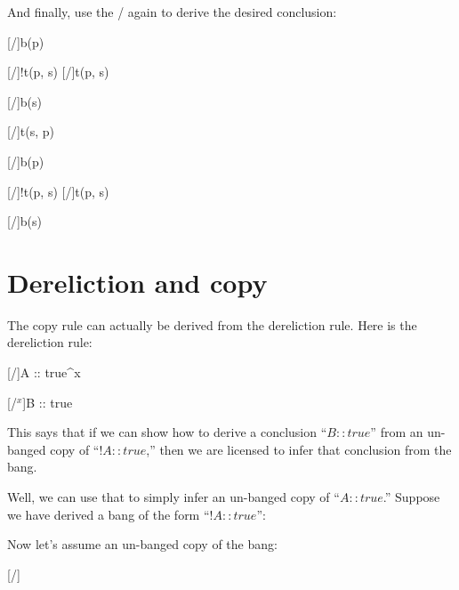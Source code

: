 \documentclass[../../../main.tex]{subfiles}
\begin{document}
\noindent
And finally, use the \traderule/ again to derive the desired conclusion:

\begin{prooftree*}
  \hypo{}
  [\startrule/]{b(p)}
  
  \hypo{}
  [\startrule/]{!t(p, s)}
  [\bangCopy/]{t(p, s)}
  
  [\traderule/]{b(s)}
  
  \hypo{}
  [\startrule/]{t(s, p)}
  
  [\traderule/]{b(p)}

  \hypo{}
  [\startrule/]{!t(p, s)}
  [\bangCopy/]{t(p, s)}

  [\traderule/]{b(s)}

\end{prooftree*}


\section{Dereliction and copy}
 
The copy rule can actually be derived from the dereliction rule. Here is the dereliction rule:

\begin{prooftree*}
  \hypo{}
  
  \hypo{}
  [\startrule/]{A :: true^{x}}
  
  [\bangDer/$^{x}$]{B :: true}
\end{prooftree*}

\noindent
This says that if we can show how to derive a conclusion ``$B :: true$'' from an un-banged copy of ``$!A :: true$,'' then we are licensed to infer that conclusion from the bang.

Well, we can use that to simply infer an un-banged copy of ``$A :: true$.'' Suppose we have derived a bang of the form ``$!A :: true$'':

\begin{prooftree*}
  \hypo{}
\end{prooftree*}

\noindent
Now let's assume an un-banged copy of the bang:

\begin{prooftree*}
  \hypo{}
  
  \hypo{}
  [\startrule/]{}
  
\end{prooftree*}
\end{document}
